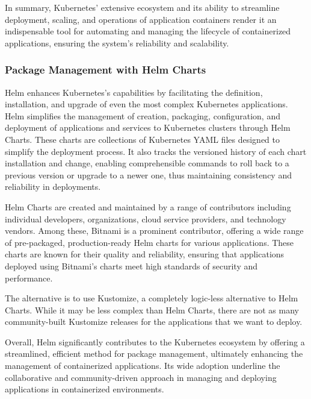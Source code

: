 \documentclass{report}
\begin{document}
    In summary, Kubernetes' extensive ecosystem and its ability to streamline deployment, scaling, and operations of application containers render it an indispensable tool for automating and managing the lifecycle of containerized applications, ensuring the system's reliability and scalability.

    \subsubsection{Package Management with Helm Charts}
    Helm enhances Kubernetes's capabilities by facilitating the definition, installation, and upgrade of even the most complex Kubernetes applications. Helm simplifies the management of creation, packaging, configuration, and deployment of applications and services to Kubernetes clusters through Helm Charts. These charts are collections of Kubernetes YAML files designed to simplify the deployment process. It also tracks the versioned history of each chart installation and change, enabling comprehensible commands to roll back to a previous version or upgrade to a newer one, thus maintaining consistency and reliability in deployments.

    Helm Charts are created and maintained by a range of contributors including individual developers, organizations, cloud service providers, and technology vendors. Among these, Bitnami is a prominent contributor, offering a wide range of pre-packaged, production-ready Helm charts for various applications. These charts are known for their quality and reliability, ensuring that applications deployed using Bitnami's charts meet high standards of security and performance.

    The alternative is to use Kustomize, a completely logic-less alternative to Helm Charts. While it may be less complex than Helm Charts, there are not as many community-built Kustomize releases for the applications that we want to deploy.

    Overall, Helm significantly contributes to the Kubernetes ecosystem by offering a streamlined, efficient method for package management, ultimately enhancing the management of containerized applications. Its wide adoption underline the collaborative and community-driven approach in managing and deploying applications in containerized environments.
\end{document}
